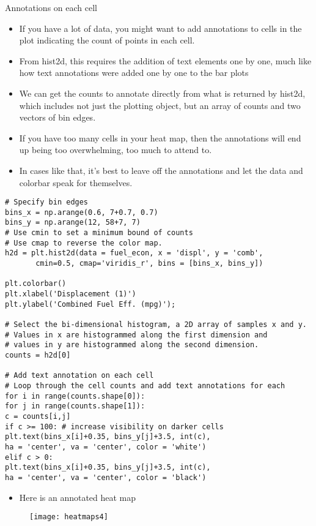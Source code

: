 \documentclass[12pt]{beamer}
\begin{document}
    \begin{frame}{Annotations on each cell}
    	\begin{itemize}
    		\item If you have a lot of data, you might want to add annotations to cells in the plot indicating the count of points in each cell. 
    		\item From hist2d, this requires the addition of text elements one by one, much like how text annotations were added one by one to the bar plots
    		\item We can get the counts to annotate directly from what is returned by hist2d, which includes not just the plotting object, but an array of counts and two vectors of bin edges.
    		\item If you have too many cells in your heat map, then the annotations will end up being too overwhelming, too much to attend to.
    		\item  In cases like that, it's best to leave off the annotations and let the data and colorbar speak for themselves.
    	\end{itemize}
    \end{frame}
    \begin{frame}[fragile]{}
    	\fontsize{9}{0.8}
    	\begin{verbatim}
# Specify bin edges 
bins_x = np.arange(0.6, 7+0.7, 0.7)
bins_y = np.arange(12, 58+7, 7)
# Use cmin to set a minimum bound of counts 
# Use cmap to reverse the color map. 
h2d = plt.hist2d(data = fuel_econ, x = 'displ', y = 'comb', 
       cmin=0.5, cmap='viridis_r', bins = [bins_x, bins_y])

plt.colorbar()
plt.xlabel('Displacement (1)')
plt.ylabel('Combined Fuel Eff. (mpg)');

# Select the bi-dimensional histogram, a 2D array of samples x and y. 
# Values in x are histogrammed along the first dimension and 
# values in y are histogrammed along the second dimension.
counts = h2d[0]

# Add text annotation on each cell
# Loop through the cell counts and add text annotations for each
for i in range(counts.shape[0]):
for j in range(counts.shape[1]):
c = counts[i,j]
if c >= 100: # increase visibility on darker cells
plt.text(bins_x[i]+0.35, bins_y[j]+3.5, int(c),
ha = 'center', va = 'center', color = 'white')
elif c > 0:
plt.text(bins_x[i]+0.35, bins_y[j]+3.5, int(c),
ha = 'center', va = 'center', color = 'black')
    	\end{verbatim}
    \end{frame}
    \begin{frame}{}
    	\begin{itemize}
    		\item Here is an annotated heat map
    	\end{itemize}
        \begin{figure}
        	\centering
        	\texttt{[image: heatmaps4]}
        \end{figure}
    \end{frame}
\end{document}
